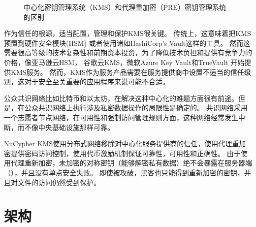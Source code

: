 \documentclass[longbibliography,nofootinbib]{revtex4-1}
\newcommand{\kms}{NuCypher KMS}
\begin{document}
\begin{figure}
    \centering
    \qquad
    \qquad
    \caption{中心化密钥管理系统（KMS）和代理重加密（PRE）密钥管理系统的区别}
    \label{fig:kms}
\end{figure}

作为信任的根源，适当配置，管理和保护KMS很关键。
传统上，这意味着把KMS预置到硬件安全模块(HSM)\cite{wiki:hsm} 或者使用诸如HashiCorp’s Vault\cite{web:hashicorp-vault}这样的工具。
然而这需要很高等级的技术复杂性和前期资本投资，为了降低技术负担和提供有竞争力的价格，像亚马逊云HSM\cite{web:aws-cloudhsm}，
谷歌云KMS\cite{web:google-cloud-kms}，微软Azure Key Vault\cite{web:azure-key-vault}和TrueVault\cite{web:truevault} 开始提供KMS服务。
然而，KMS作为服务产品需要在服务提供商中设置不适当的信任级别，这对于安全至关重要的应用程序来说可能不合适。

公众共识网络比如比特币和以太坊，在解决这种中心化的难题方面很有前途。但是，在公众共识网络上执行涉及私密数据操作的局限性是确定的\cite{cryptoeprint:2017:201}。
共识网络采用一个志愿者节点网络，在可用性和强制访问管理规则方面，这种网络经常发生中断，而不像中央基础设施那样可靠。

\kms 使用分布式网络移除对中心化服务提供商的信任，使用代理重加密提供密码访问控制，使用代币激励机制保证可靠性，可用性和正确性。
由于使用代理重新加密，未加密的对称密钥（能够解密私有数据）绝不会暴露在服务器端（），并且没有单点安全失败。
即使被攻破，黑客也只能得到重新加密的密钥，并且对文件的访问仍然受到保护。

\section{架构}
\end{document}
